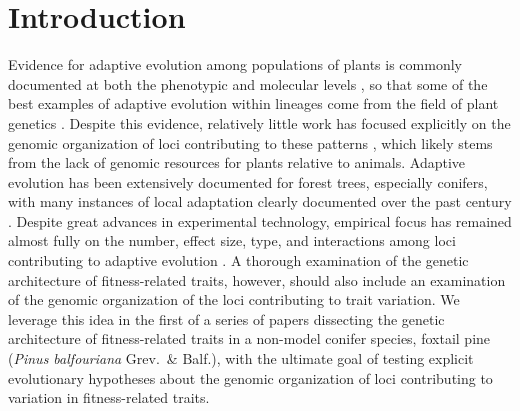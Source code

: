\documentclass[smallextended]{svjour3}
\begin{document}
\section*{Introduction}

Evidence for adaptive evolution among populations of plants is commonly
documented at both the phenotypic and molecular levels \citep{Kawecki:2004,
  Pannell:2013}, so that some of the best examples of adaptive evolution within
lineages come from the field of plant genetics \citep[e.g.,][]{Antonovics:1970}.
Despite this evidence, relatively little work has focused explicitly on the
genomic organization of loci contributing to these patterns
\citep{Hoffman:2008}, which likely stems from the lack of genomic resources
for plants relative to animals.  Adaptive evolution has been extensively
documented for forest trees, especially conifers, with many instances of local
adaptation clearly documented over the past century \citep{White:2007,
  Neale:2011}. Despite great advances in experimental technology, empirical
focus has remained almost fully on the number, effect size, type, and
interactions among loci contributing to adaptive evolution \citep{Neale:2011,
  Alberto:2013}.  A thorough examination of the genetic architecture of
fitness-related traits, however, should also include an examination of the
genomic organization of the loci contributing to trait variation. We
leverage this idea in the first of a series of papers dissecting the genetic
architecture of fitness-related traits in a non-model conifer species, foxtail
pine (\textit{Pinus balfouriana} Grev.\  \& Balf.), with the ultimate goal of
testing explicit evolutionary hypotheses about the genomic organization of loci
contributing to variation in fitness-related traits.
\end{document}
